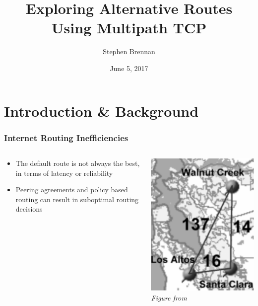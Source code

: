 \documentclass{beamer}
\title{Exploring Alternative Routes Using Multipath TCP}
\author{Stephen Brennan}
\date{June 5, 2017}
\begin{document}
\frame{\titlepage}

\section{Introduction \& Background}

\begin{frame}
  \frametitle{Internet Routing Inefficiencies}
  \begin{columns}
  \begin{column}{0.7\textwidth}
  \begin{itemize}
  \item The default route is not always the best, in terms of latency or
    reliability
  \item Peering agreements and policy based routing can result in suboptimal
    routing decisions \cite{detour}
  \end{itemize}
  \end{column}
  \begin{column}{0.3\textwidth}
    \includegraphics[width=\textwidth]{figures/detour.png} \\
    \textit{Figure from \cite{detour}}
  \end{column}
  \end{columns}
\end{frame}
\end{document}
